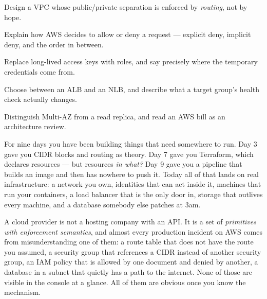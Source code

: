 
\begin{objectives}
\begin{wbitem}
  \item Design a VPC whose public/private separation is enforced by \emph{routing}, not by hope.
  \item Explain how AWS decides to allow or deny a request --- explicit deny, implicit deny, and the order in between.
  \item Replace long-lived access keys with roles, and say precisely where the temporary credentials come from.
  \item Choose between an ALB and an NLB, and describe what a target group's health check actually changes.
  \item Distinguish Multi-AZ from a read replica, and read an AWS bill as an architecture review.
\end{wbitem}
\end{objectives}


 For nine days you have been building things that need somewhere to run. Day 3 gave you CIDR blocks and routing as theory. Day 7 gave you Terraform, which declares resources --- but resources \emph{in what?} Day 9 gave you a pipeline that builds an image and then has nowhere to push it. Today all of that lands on real infrastructure: a network you own, identities that can act inside it, machines that run your containers, a load balancer that is the only door in, storage that outlives every machine, and a database somebody else patches at 3am.

 A cloud provider is not a hosting company with an API. It is a set of \emph{primitives with enforcement semantics}, and almost every production incident on AWS comes from misunderstanding one of them: a route table that does not have the route you assumed, a security group that references a CIDR instead of another security group, an IAM policy that is allowed by one document and denied by another, a database in a subnet that quietly has a path to the internet. None of those are visible in the console at a glance. All of them are obvious once you know the mechanism.

